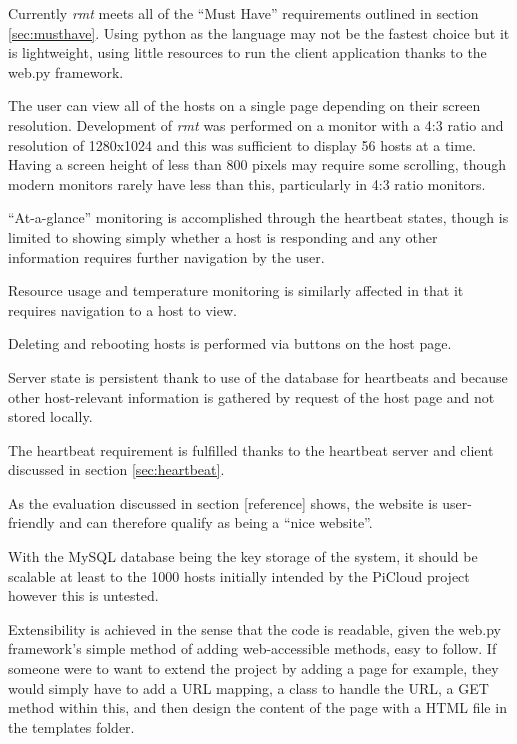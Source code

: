 Currently \emph{rmt} meets all of the ``Must Have'' requirements outlined in section \ref{sec:musthave}.
Using python as the language may not be the fastest choice but it is lightweight, using little resources to run the client application thanks to the web.py framework.

The user can view all of the hosts on a single page depending on their screen resolution.
Development of \emph{rmt} was performed on a monitor with a 4:3 ratio and resolution of 1280x1024 and this was sufficient to display 56 hosts at a time.
Having a screen height of less than 800 pixels may require some scrolling, though modern monitors rarely have less than this, particularly in 4:3 ratio monitors.

``At-a-glance'' monitoring is accomplished through the heartbeat states, though is limited to showing simply whether a host is responding and any other information requires further navigation by the user.

Resource usage and temperature monitoring is similarly affected in that it requires navigation to a host to view.

Deleting and rebooting hosts is performed via buttons on the host page.

Server state is persistent thank to use of the database for heartbeats and because other host-relevant information is gathered by request of the host page and not stored locally.

The heartbeat requirement is fulfilled thanks to the heartbeat server and client discussed in section \ref{sec:heartbeat}.

As the evaluation discussed in section [reference] %
shows, the website is user-friendly and can therefore qualify as being a ``nice website''.

With the MySQL database being the key storage of the system, it should be scalable at least to the 1000 hosts initially intended by the PiCloud project however this is untested.

Extensibility is achieved in the sense that the code is readable, given the web.py framework's simple method of adding web-accessible methods, easy to follow.
If someone were to want to extend the project by adding a page for example, they would simply have to add a URL mapping, a class to handle the URL, a GET method within this, and then design the content of the page with a HTML file in the templates folder.

